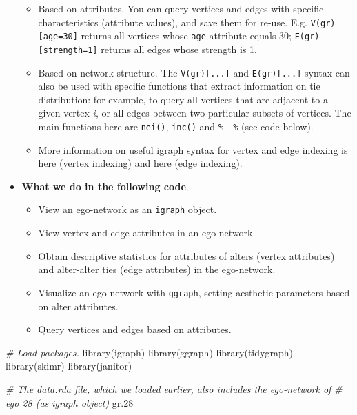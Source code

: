 \documentclass[
]{book}
\newenvironment{Shaded}{\begin{snugshade}}{\end{snugshade}}
\newcommand{\CommentTok}[1]{\textcolor[rgb]{0.56,0.35,0.01}{\textit{#1}}}
\newcommand{\FloatTok}[1]{\textcolor[rgb]{0.00,0.00,0.81}{#1}}
\newcommand{\FunctionTok}[1]{\textcolor[rgb]{0.00,0.00,0.00}{#1}}
\newcommand{\NormalTok}[1]{#1}
\providecommand{\tightlist}{%
  \setlength{\itemsep}{0pt}\setlength{\parskip}{0pt}}
\begin{document}
\begin{itemize}
  \begin{itemize}
  \tightlist
  \item
    Based on attributes. You can query vertices and edges with specific characteristics (attribute values), and save them for re-use. E.g. \texttt{V(gr){[}age=30{]}} returns all vertices whose \texttt{age} attribute equals 30; \texttt{E(gr){[}strength=1{]}} returns all edges whose strength is 1.
  \item
    Based on network structure. The \texttt{V(gr){[}...{]}} and \texttt{E(gr){[}...{]}} syntax can also be used with specific functions that extract information on tie distribution: for example, to query all vertices that are adjacent to a given vertex \emph{i}, or all edges between two particular subsets of vertices. The main functions here are \texttt{nei()}, \texttt{inc()} and \texttt{\%-\/-\%} (see code below).
  \item
    More information on useful igraph syntax for vertex and edge indexing is \href{http://igraph.org/r/doc/igraph-vs-indexing.html}{here} (vertex indexing) and \href{http://igraph.org/r/doc/igraph-es-indexing.html}{here} (edge indexing).
  \end{itemize}
\item
  \textbf{What we do in the following code}.

  \begin{itemize}
  \tightlist
  \item
    View an ego-network as an \texttt{igraph} object.
  \item
    View vertex and edge attributes in an ego-network.
  \item
    Obtain descriptive statistics for attributes of alters (vertex attributes) and alter-alter ties (edge attributes) in the ego-network.
  \item
    Visualize an ego-network with \texttt{ggraph}, setting aesthetic parameters based on alter attributes.
  \item
    Query vertices and edges based on attributes.
  \end{itemize}
\end{itemize}

\begin{Shaded}
\begin{Highlighting}[]
\CommentTok{\# Load packages.}
\FunctionTok{library}\NormalTok{(igraph)}
\FunctionTok{library}\NormalTok{(ggraph)}
\FunctionTok{library}\NormalTok{(tidygraph)}
\FunctionTok{library}\NormalTok{(skimr)}
\FunctionTok{library}\NormalTok{(janitor)}

\CommentTok{\# The data.rda file, which we loaded earlier, also includes the ego{-}network of }
\CommentTok{\# ego 28 (as igraph object)}
\NormalTok{gr}\FloatTok{.28}
\end{Highlighting}
\end{Shaded}
\end{document}
